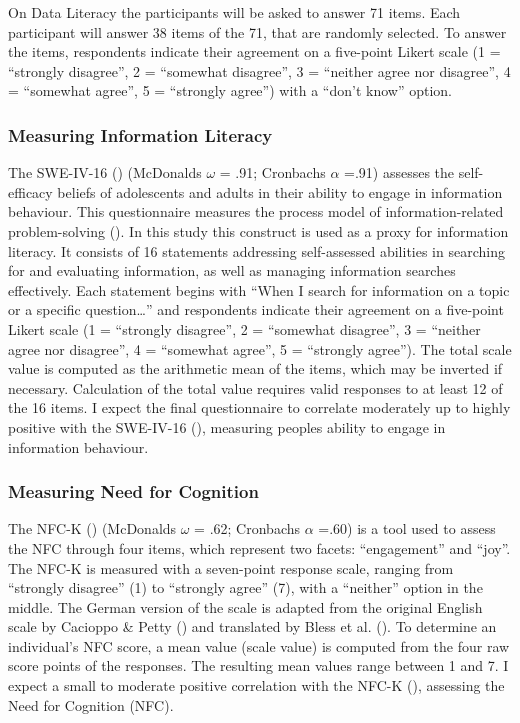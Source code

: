\documentclass[
  12pt,
  a4paper,
  twoside]{article}
\begin{document}
On Data Literacy the participants will be asked to answer 71
items. Each participant will answer 38 items of the 71, that are randomly selected.
To answer the items, respondents indicate their agreement on a five-point Likert
scale (1 = ``strongly disagree'', 2 = ``somewhat disagree'', 3 = ``neither agree nor
disagree'', 4 = ``somewhat agree'', 5 = ``strongly agree'') with a ``don't know''
option.

\subsubsection{Measuring Information Literacy}\label{measuring-information-literacy}

The SWE-IV-16 () (McDonalds \(\omega\) = .91; Cronbachs \(\alpha\) =.91) assesses the self-efficacy beliefs
of adolescents and adults in their ability to engage in information behaviour. This
questionnaire measures the process model of information-related problem-solving
(). In this study this construct is used as a proxy for information literacy.
It consists of 16 statements addressing self-assessed
abilities in searching for and evaluating information, as well as managing
information searches effectively. Each statement begins with ``When I search for
information on a topic or a specific question\ldots{}'' and respondents indicate their
agreement on a five-point Likert scale (1 = ``strongly disagree'', 2 = ``somewhat
disagree'', 3 = ``neither agree nor disagree'', 4 = ``somewhat agree'', 5 = ``strongly
agree''). The total scale value is computed as the arithmetic
mean of the items, which may be inverted if necessary. Calculation of the total value
requires valid responses to at least 12 of the 16 items. I expect the final questionnaire to correlate moderately up to highly positive with the SWE-IV-16 (), measuring peoples ability to engage in information behaviour.

\subsubsection{Measuring Need for Cognition}\label{measuring-need-for-cognition}

The NFC-K () (McDonalds \(\omega\) = .62; Cronbachs \(\alpha\) =.60) is a tool used to assess the
NFC through four items, which represent two facets: ``engagement'' and ``joy''. The
NFC-K is measured with a seven-point response scale, ranging from ``strongly
disagree'' (1) to ``strongly agree'' (7), with a ``neither'' option in the middle. The
German version of the scale is adapted from the original English scale by Cacioppo \& Petty () and translated by Bless et al. (). To determine an individual's NFC score, a mean value
(scale value) is computed from the four raw score points of the responses. The
resulting mean values range between 1 and 7. I expect a small to moderate positive correlation with the NFC-K (), assessing the Need for Cognition (NFC).
\end{document}
